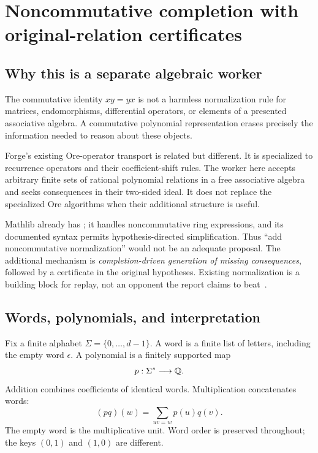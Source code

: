 \section{Noncommutative completion with original-relation certificates}
\label{sec:nc}

\subsection{Why this is a separate algebraic worker}
The commutative identity \(xy=yx\) is not a harmless normalization rule for matrices, endomorphisms, differential operators, or elements of a presented associative algebra. A commutative polynomial representation erases precisely the information needed to reason about these objects.

Forge's existing Ore-operator transport is related but different. It is specialized to recurrence operators and their coefficient-shift rules. The worker here accepts arbitrary finite sets of rational polynomial relations in a free associative algebra and seeks consequences in their two-sided ideal. It does not replace the specialized Ore algorithms when their additional structure is useful.

Mathlib already has ; it handles noncommutative ring expressions, and its documented syntax permits hypothesis-directed simplification. Thus ``add noncommutative normalization'' would not be an adequate proposal. The additional mechanism is \emph{completion-driven generation of missing consequences}, followed by a certificate in the original hypotheses. Existing normalization is a building block for replay, not an opponent the report claims to beat~\cite{noncomm-ring}.

\subsection{Words, polynomials, and interpretation}
Fix a finite alphabet \(\Sigma=\{0,\ldots,d-1\}\). A word is a finite list of letters, including the empty word \(\epsilon\). A polynomial is a finitely supported map
\[
 p:\Sigma^*\longrightarrow\mathbb{Q}.
\]
Addition combines coefficients of identical words. Multiplication concatenates words:
\[
 (pq)(w)=\sum_{uv=w}p(u)q(v).
\]
The empty word is the multiplicative unit. Word order is preserved throughout; the keys \((0,1)\) and \((1,0)\) are different.

